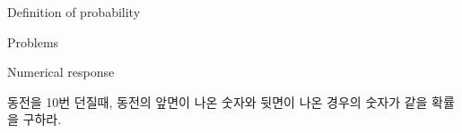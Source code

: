\begin{edXchapter}{Definition of probability}

\begin{edXsection}{Problems}

\begin{edXvertical}

\begin{edXproblem}{Numerical response}

동전을 10번 던질때, 동전의 앞면이 나온 숫자와 뒷면이 나온 경우의 숫자가 같을 확률을 구하라.


\end{edXproblem}
\end{edXvertical}
\end{edXsection}
\end{edXchapter}

